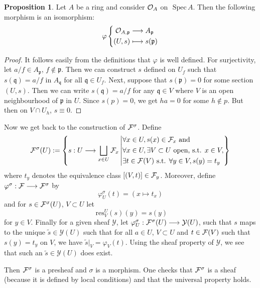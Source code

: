 \documentclass[11pt]{article}
\theoremstyle{definition}
\newtheorem{prop}[thm]{Proposition}
\newcommand{\spec}{\text{ Spec}\,}
\newcommand{\res}{\text{ res}}
\newcommand{\scp}{{\mathfrak p}}
\newcommand{\scq}{\mathfrak q}
\newcommand{\calf}{{\cal F}}
\newcommand{\calo}{{\cal O}}
\begin{document}
\begin{prop}
    Let $A$ be a ring and consider $\calo_A$ on $\spec A$. Then the following morphism is an isomorphism:
    $$
    \varphi
    \left\{
    \begin{aligned}
    \calo_{A,\scp} & \longrightarrow A_\scp \\
    (U,s) & \longmapsto s(\scp)
    \end{aligned}
    \right.
    $$
\end{prop}

\begin{proof}
    It follows easily from the definitions that $\varphi$ is well defined. For surjectivity, let $a/f\in A_\scp$, $f\notin \scp$.  Then we can construct $s$ defined on $U_f$ such that $s(\scq) = a/f$ in $A_\scq$ for all $\scq \in U_f$.    
    Next, suppose that $s(\scp)=0$ for some section $(U,s)$. Then we can write $s(\scq) = a/f$ for any $\scq\in V$ where $V$ is an open neighbourhood of $\scp$ in $U$. Since $s(p)=0$, we get $ha=0$ for some $h \notin p$. But then on $V \cap U_h$, $s\equiv 0$. 
\end{proof}

Now we get back to the construction of $\calf^\sigma$. Define
$$
\calf^\sigma(U) := \left\{ 
    s: U \longrightarrow \bigsqcup_{x \in U} \calf_x \left| 
    \begin{aligned}
    & \forall x \in U, s(x) \in \calf_x \text{ and} \\
    & \forall x \in U, \exists V \subset U \text{ open, s.t. } x\in V, \\
    & \exists t \in \calf(V) \text{ s.t. } \forall y \in V, s(y) = t_y 
    \end{aligned}
    \right\} \right.
$$
where $t_y$ denotes the equivalence class $[(V,t)]\in \calf_y$.
Moreover, define $\varphi^\sigma: \calf \longrightarrow \calf^\sigma$ by 
$$
\varphi^\sigma_U(t) = (x \longmapsto t_x)
$$
and for $s \in \calf^\sigma(U)$, $V\subset U$ let 
$$
\res_V^U(s)(y) = s(y) 
$$
for $y\in V$. Finally for a given sheaf $\mathcal Y$, let $\varphi^\sigma_U: \calf^\sigma(U) \longrightarrow \mathcal Y(U)$, such that $s$ maps to the unique $\tilde s \in \mathcal Y(U)$ such that for all $a\in U$, $V\subset U$ and $t \in \calf(V)$ such that $s(y) = t_y$ on $V$, we have $\tilde s|_V = \varphi_V(t)$. Using the sheaf property of $\mathcal Y$, we see that such an $\tilde s \in \mathcal Y(U)$ does exist.

Then $\calf^\sigma$ is a presheaf and $\sigma$ is a morphism. One checks that $\calf^\sigma$ is a sheaf (because it is defined by local conditions) and that the universal property holds.
\end{document}
